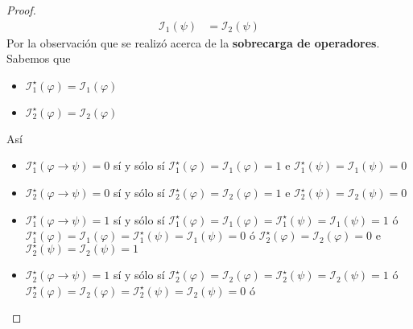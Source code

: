 \documentclass[a4paper]{article}
\begin{document}
\begin{proof}
\begin{align*}
        \mathcal{I}_1(\psi) &= \mathcal{I}_2(\psi)
    \end{align*}
    Por la observación que se realizó acerca de la \textbf{sobrecarga de operadores}. Sabemos que 
    \begin{itemize}
        \item \(\mathcal{I}^{\star}_{1}\left(\varphi\right) = \mathcal{I}_{1}\left(\varphi\right)\)
        \item \(\mathcal{I}^{\star}_{2}\left(\varphi\right) = \mathcal{I}_{2}\left(\varphi\right)\)
    \end{itemize}
    Así
    \begin{itemize}
        \item \(\mathcal{I}^{\star}_{1}\left(\varphi \to \psi\right) = 0\) sí y sólo sí \(\mathcal{I}^{\star}_{1}\left( \varphi\right) = \mathcal{I}_{1}\left( \varphi\right) = 1\) e \(\mathcal{I}^{\star}_{1}\left( \psi\right) = \mathcal{I}_{1}\left( \psi\right) = 0\)
        \item \(\mathcal{I}^{\star}_{2}\left(\varphi \to \psi\right) = 0\) sí y sólo sí \(\mathcal{I}^{\star}_{2}\left( \varphi\right) = \mathcal{I}_{2}\left( \varphi\right) = 1\) e \(\mathcal{I}^{\star}_{2}\left( \psi\right) = \mathcal{I}_{2}\left( \psi\right) = 0\)
        \item \(\mathcal{I}^{\star}_{1}\left(\varphi \to \psi\right) = 1\) sí y sólo sí 
        \(\mathcal{I}^{\star}_{1}\left( \varphi\right) = \mathcal{I}_{1}\left( \varphi\right) = \mathcal{I}^{\star}_{1}\left(\psi\right) = \mathcal{I}_{1}\left(\psi\right) = 1\) ó 
        \newline
        \(\mathcal{I}^{\star}_{1}\left(\varphi\right) = \mathcal{I}_{1}\left(\varphi\right) = \mathcal{I}^{\star}_{1}\left(\psi\right) = \mathcal{I}_{1}\left(\psi\right) = 0\) ó 
        \newline
        \(\mathcal{I}^{\star}_{2}\left( \varphi\right) = \mathcal{I}_{2}\left( \varphi\right) = 0\) e \(\mathcal{I}^{\star}_{2}\left( \psi\right) = \mathcal{I}_{2}\left( \psi\right) = 1\)
        \item \(\mathcal{I}^{\star}_{2}\left(\varphi \to \psi\right) = 1\) sí y sólo sí 
        \(\mathcal{I}^{\star}_{2}\left( \varphi\right) = \mathcal{I}_{2}\left( \varphi\right) = \mathcal{I}^{\star}_{2}\left(\psi\right) = \mathcal{I}_{2}\left(\psi\right) = 1\) ó 
        \newline
        \(\mathcal{I}^{\star}_{2}\left(\varphi\right) = \mathcal{I}_{2}\left(\varphi\right) = \mathcal{I}^{\star}_{2}\left(\psi\right) = \mathcal{I}_{2}\left(\psi\right) = 0\) ó 

\end{itemize}
\end{proof}
\end{document}
